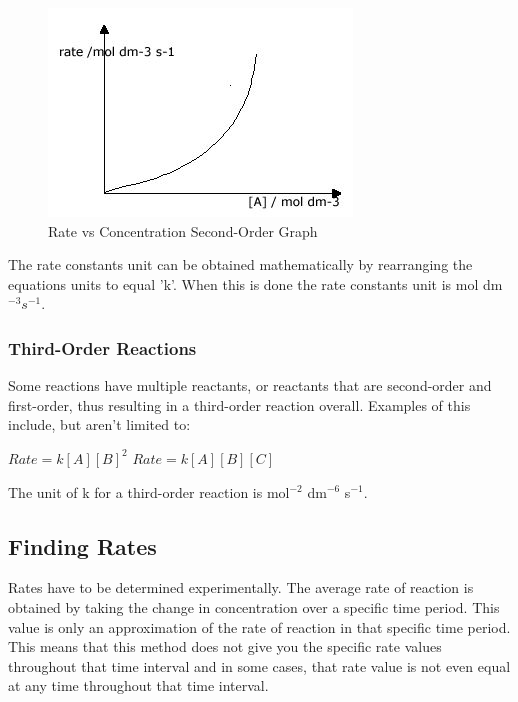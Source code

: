 \begin{figure}[H]
    \includegraphics[width=\textwidth]{./Planning/Images/SecondOrder.jpg}
    \caption{ Rate vs Concentration Second-Order Graph} \label{fig:Second Order Graph}
\end{figure}

The rate constants unit can be obtained mathematically by rearranging the equations units to equal 'k'. When this is done the rate constants unit is mol dm$^{-3} s^{-1}$.

\subsubsection{Third-Order Reactions}

Some reactions have multiple reactants, or reactants that are second-order and first-order, thus resulting in a third-order reaction overall. Examples of this include, but aren't limited to:

$Rate = k [A] [B]^2$
$Rate = k [A] [B] [C]$

The unit of k for a third-order reaction is mol$^{-2}$ dm$^{-6}$ s$^{-1}$.







	\subsection{Finding Rates}


Rates have to be determined experimentally. The average rate of reaction is obtained by taking the change in concentration over a specific time period. This value is only an approximation of the rate of reaction in that specific time period. This means that this method does not give you the specific rate values throughout that time interval and in some cases, that rate value is not even equal at any time throughout that time interval.

